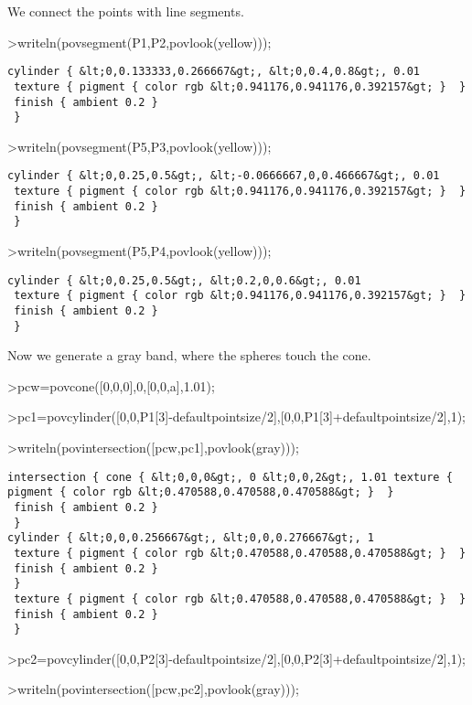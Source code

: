 \documentclass[
]{book}
\begin{document}
We connect the points with line segments.

\textgreater writeln(povsegment(P1,P2,povlook(yellow)));

\begin{verbatim}
cylinder { &lt;0,0.133333,0.266667&gt;, &lt;0,0.4,0.8&gt;, 0.01
 texture { pigment { color rgb &lt;0.941176,0.941176,0.392157&gt; }  } 
 finish { ambient 0.2 } 
 }
\end{verbatim}

\textgreater writeln(povsegment(P5,P3,povlook(yellow)));

\begin{verbatim}
cylinder { &lt;0,0.25,0.5&gt;, &lt;-0.0666667,0,0.466667&gt;, 0.01
 texture { pigment { color rgb &lt;0.941176,0.941176,0.392157&gt; }  } 
 finish { ambient 0.2 } 
 }
\end{verbatim}

\textgreater writeln(povsegment(P5,P4,povlook(yellow)));

\begin{verbatim}
cylinder { &lt;0,0.25,0.5&gt;, &lt;0.2,0,0.6&gt;, 0.01
 texture { pigment { color rgb &lt;0.941176,0.941176,0.392157&gt; }  } 
 finish { ambient 0.2 } 
 }
\end{verbatim}

Now we generate a gray band, where the spheres touch the cone.

\textgreater pcw=povcone({[}0,0,0{]},0,{[}0,0,a{]},1.01);

\textgreater pc1=povcylinder({[}0,0,P1{[}3{]}-defaultpointsize/2{]},{[}0,0,P1{[}3{]}+defaultpointsize/2{]},1);

\textgreater writeln(povintersection({[}pcw,pc1{]},povlook(gray)));

\begin{verbatim}
intersection { cone { &lt;0,0,0&gt;, 0 &lt;0,0,2&gt;, 1.01 texture { pigment { color rgb &lt;0.470588,0.470588,0.470588&gt; }  } 
 finish { ambient 0.2 } 
 }
cylinder { &lt;0,0,0.256667&gt;, &lt;0,0,0.276667&gt;, 1
 texture { pigment { color rgb &lt;0.470588,0.470588,0.470588&gt; }  } 
 finish { ambient 0.2 } 
 }
 texture { pigment { color rgb &lt;0.470588,0.470588,0.470588&gt; }  } 
 finish { ambient 0.2 } 
 }
\end{verbatim}

\textgreater pc2=povcylinder({[}0,0,P2{[}3{]}-defaultpointsize/2{]},{[}0,0,P2{[}3{]}+defaultpointsize/2{]},1);

\textgreater writeln(povintersection({[}pcw,pc2{]},povlook(gray)));
\end{document}
